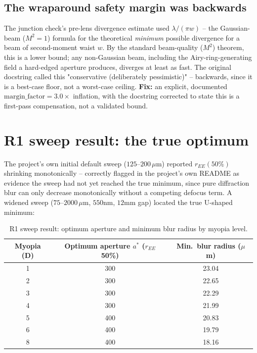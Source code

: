 \documentclass[11pt]{report}
\begin{document}
\subsection{The wraparound safety margin was backwards}
\label{sec:bugfix2}
The junction check's pre-lens divergence estimate used $\lambda/(\pi w)$ -- the Gaussian-beam ($M^2=1$) formula for the theoretical \emph{minimum} possible divergence for a beam of second-moment waist $w$. By the standard beam-quality ($M^2$) theorem, this is a lower bound; any non-Gaussian beam, including the Airy-ring-generating field a hard-edged aperture produces, diverges at least as fast. The original docstring called this "conservative (deliberately pessimistic)" -- backwards, since it is a best-case floor, not a worst-case ceiling. \textbf{Fix:} an explicit, documented $\text{margin\_factor}=3.0\times$ inflation, with the docstring corrected to state this is a first-pass compensation, not a validated bound.

\section{R1 sweep result: the true optimum}
\label{sec:r1result}
The project's own initial default sweep ($125$--$200\,\mu$m) reported $r_{EE}(50\%)$ shrinking monotonically -- correctly flagged in the project's own README as evidence the sweep had not yet reached the true minimum, since pure diffraction blur can only decrease monotonically without a competing defocus term. A widened sweep ($75$--$2000\,\mu$m, $550$nm, $12$mm gap) located the true U-shaped minimum:

\begin{table}[h!]
\centering
\caption{R1 sweep result: optimum aperture and minimum blur radius by myopia level.}
\label{tab:r1result}
\begin{tabular}{ccc}
\toprule
Myopia (D) & Optimum aperture $a^*$ ($r_{EE}$ 50\%) & Min.\ blur radius ($\mu$m) \\
\midrule
1 & 300 & 23.04 \\
2 & 300 & 22.65 \\
3 & 300 & 22.29 \\
4 & 300 & 21.99 \\
5 & 400 & 20.83 \\
6 & 400 & 19.79 \\
8 & 400 & 18.16 \\
\bottomrule
\end{tabular}
\end{table}
\end{document}
